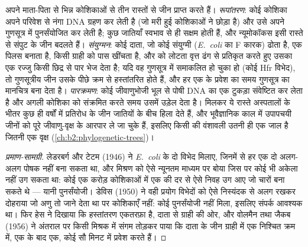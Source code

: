 \begin{definition}[क्षैतिज जीन हस्तांतरण]\label{def:b2:genome-diversification:hgt}
 अपने माता-पिता से भिन्न कोशिकाओं से तीन रास्तों से जीन
प्राप्त करते हैं। \emph{रूपांतरण}: कोई कोशिका अपने परिवेश से नंगा DNA
ग्रहण कर लेती है (जो मरी हुई कोशिकाओं ने छोड़ा है) और उसे अपने गुणसूत्र
में पुनर्संयोजित कर लेती है; कुछ जातियाँ स्वभाव से ही सक्षम होती हैं,
और न्यूमोकॉकस इसी रास्ते से संपुट के जीन बदलते हैं। \emph{संयुग्मन}:
कोई दाता, जो कोई संयुग्मी  (\emph{E.~coli} का F कारक) ढोता है,
एक पिलस बनाता है, किसी ग्राही को पास खींचता है, और  को लोटता
वृत्त ढंग से प्रतिकृत करते हुए उसका एक रज्जु किसी छिद्र से पार भेज देता
है; यदि वह  गुणसूत्र में समाकलित हो चुका हो (कोई Hfr विभेद), तो
गुणसूत्रीय जीन उसके पीछे क्रम से हस्तांतरित होते हैं, और हर एक के प्रवेश
का समय गुणसूत्र का मानचित्र बना देता है। \emph{पारक्रमण}: कोई
जीवाणुभोजी भूल से पोषी DNA का एक टुकड़ा संवेष्टित कर लेता है और अगली
कोशिका को संक्रमित करते समय उसमें उड़ेल देता है। मिलकर ये रास्ते
अस्पतालों के भीतर कुछ ही वर्षों में प्रतिरोध के जीन जातियों के बीच हिला
देते हैं, और भूवैज्ञानिक काल में उपापचयी जीनों को पूरे जीवाणु-वृक्ष के
आरपार ले जा चुके हैं, इसलिए किसी  की वंशावली उतनी ही एक
जाल है जितनी एक वृक्ष
(\cref{ch:b2:phylogenetic-trees})।
\end{definition}
\begin{proof}[प्रमाण-सामग्री]
लेडरबर्ग और टेटम (1946) ने \emph{E.~coli} के दो विभेद मिलाए, जिनमें से
हर एक दो अलग-अलग पोषक नहीं बना सकता था, और मिश्रण को ऐसे न्यूनतम माध्यम
पर बोया जिस पर कोई भी अकेला नहीं उग सकता था: कोई एक करोड़ कोशिकाओं में
एक की दर से ऐसे निवह उग आए जो चारों बना सकते थे --- यानी पुनर्संयोजी।
डेविस (1950) ने वही प्रयोग विभेदों को ऐसे निस्यंदक से अलग रखकर दोहराया
जो अणु तो जाने देता था पर कोशिकाएँ नहीं: कोई पुनर्संयोजी नहीं मिला,
इसलिए संपर्क आवश्यक था। फिर हेस ने दिखाया कि हस्तांतरण एकतरफ़ा है, दाता
से ग्राही की ओर, और वोलमैन तथा जैकब (1956) ने अंतराल पर किसी मिश्रक में
संगम तोड़कर पाया कि दाता के जीन ग्राही में एक निश्चित क्रम में, एक के
बाद एक, कोई सौ मिनट में प्रवेश करते हैं।
\end{proof}

